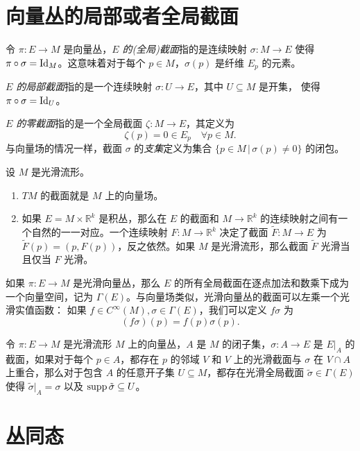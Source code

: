 \section{向量丛的局部或者全局截面}

令 $\pi:E\to M$ 是向量丛，\emph{$E$ 的(全局)截面}指的是连续映射 $\sigma:M\to E$ 使得
$\pi\circ\sigma=\operatorname{Id}_M$。这意味着对于每个 $p\in M$，$\sigma(p)$ 是纤维 $E_p$ 的元素。

\emph{$E$ 的局部截面}指的是一个连续映射 $\sigma:U\to E$，其中 $U\subseteq M$ 是开集，
使得 $\pi\circ\sigma=\operatorname{Id}_U$。

\emph{$E$ 的零截面}指的是一个全局截面 $\zeta:M\to E$，其定义为
\[
  \zeta(p)=0\in E_p\quad \forall p\in M.
\]
与向量场的情况一样，截面 $\sigma$ 的\emph{支集}定义为集合 $\{p\in M\,|\, \sigma(p)\neq 0\}$ 的闭包。

\begin{example}[向量丛的截面]
  设 $M$ 是光滑流形。
  \begin{enumerate}
    \item $TM$ 的截面就是 $M$ 上的向量场。
    \item 如果 $E=M\times \mathbb{R}^k$ 是积丛，那么在 $E$ 的截面和
    $M\to \mathbb{R}^k$ 的连续映射之间有一个自然的一一对应。一个连续映射 $F:M\to \mathbb{R}^k$
    决定了截面 $\tilde F:M\to E$ 为 $\tilde F(p)=(p,F(p))$，反之依然。如果 $M$
    是光滑流形，那么截面 $\tilde F$ 光滑当且仅当 $F$ 光滑。
  \end{enumerate}
\end{example}

如果 $\pi:E\to M$ 是光滑向量丛，那么 $E$ 的所有全局截面在逐点加法和数乘下成为一个向量空间，记为
$\Gamma(E)$。与向量场类似，光滑向量丛的截面可以左乘一个光滑实值函数：
如果 $f\in C^\infty(M),\sigma\in\Gamma(E)$，我们可以定义 $f\sigma$ 为
\[
  (f\sigma)(p)=f(p)\sigma(p).
\] 

\begin{lemma}[向量丛的延拓引理]
  令 $\pi:E\to M$ 是光滑流形 $M$ 上的向量丛，$A$ 是 $M$ 的闭子集，$\sigma:A\to E$
  是 $E|_A$ 的截面，如果对于每个 $p\in A$，都存在 $p$ 的邻域 $V$ 和
  $V$ 上的光滑截面与 $\sigma$ 在 $V\cap A$ 上重合，那么对于包含 $A$ 的任意开子集
  $U\subseteq M$，都存在光滑全局截面 $\tilde\sigma\in \Gamma(E)$ 使得
  $\tilde{\sigma}|_A=\sigma$ 以及 $\operatorname{supp}\tilde{\sigma}\subseteq U$。
\end{lemma}


\section{丛同态}

